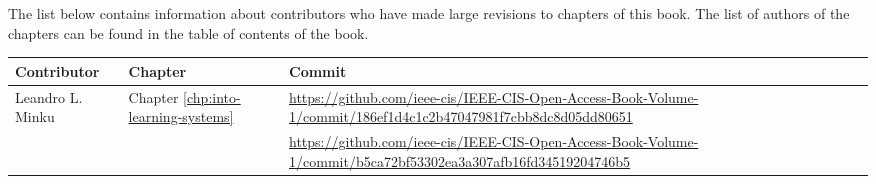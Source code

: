 
\contributors

The list below contains information about contributors who have made large revisions to chapters of this book. The list of authors of the chapters can be found in the table of contents of the book.

\begin{center}
\begin{tabularx}{1.2\textwidth}{|l|l|X|} \hline
Contributor & Chapter & Commit \\ \hline
Leandro L. Minku & Chapter \ref{chp:into-learning-systems} & \url{https://github.com/ieee-cis/IEEE-CIS-Open-Access-Book-Volume-1/commit/186ef1d4c1c2b47047981f7cbb8dc8d05dd80651} \\ \cline{3-3} 
& & \url{https://github.com/ieee-cis/IEEE-CIS-Open-Access-Book-Volume-1/commit/b5ca72bf53302ea3a307afb16fd34519204746b5} \\ \hline

\end{tabularx}
\end{center}